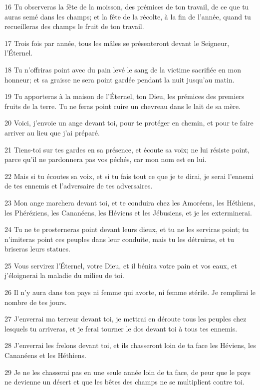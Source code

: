 \par 16 Tu observeras la fête de la moisson, des prémices de ton travail, de ce que tu auras semé dans les champs; et la fête de la récolte, à la fin de l'année, quand tu recueilleras des champs le fruit de ton travail.
\par 17 Trois fois par année, tous les mâles se présenteront devant le Seigneur, l'Éternel.
\par 18 Tu n'offriras point avec du pain levé le sang de la victime sacrifiée en mon honneur; et sa graisse ne sera point gardée pendant la nuit jusqu'au matin.
\par 19 Tu apporteras à la maison de l'Éternel, ton Dieu, les prémices des premiers fruits de la terre. Tu ne feras point cuire un chevreau dans le lait de sa mère.
\par 20 Voici, j'envoie un ange devant toi, pour te protéger en chemin, et pour te faire arriver au lieu que j'ai préparé.
\par 21 Tiens-toi sur tes gardes en sa présence, et écoute sa voix; ne lui résiste point, parce qu'il ne pardonnera pas vos péchés, car mon nom est en lui.
\par 22 Mais si tu écoutes sa voix, et si tu fais tout ce que je te dirai, je serai l'ennemi de tes ennemis et l'adversaire de tes adversaires.
\par 23 Mon ange marchera devant toi, et te conduira chez les Amoréens, les Héthiens, les Phéréziens, les Cananéens, les Héviens et les Jébusiens, et je les exterminerai.
\par 24 Tu ne te prosterneras point devant leurs dieux, et tu ne les serviras point; tu n'imiteras point ces peuples dans leur conduite, mais tu les détruiras, et tu briseras leurs statues.
\par 25 Vous servirez l'Éternel, votre Dieu, et il bénira votre pain et vos eaux, et j'éloignerai la maladie du milieu de toi.
\par 26 Il n'y aura dans ton pays ni femme qui avorte, ni femme stérile. Je remplirai le nombre de tes jours.
\par 27 J'enverrai ma terreur devant toi, je mettrai en déroute tous les peuples chez lesquels tu arriveras, et je ferai tourner le dos devant toi à tous tes ennemis.
\par 28 J'enverrai les frelons devant toi, et ils chasseront loin de ta face les Héviens, les Cananéens et les Héthiens.
\par 29 Je ne les chasserai pas en une seule année loin de ta face, de peur que le pays ne devienne un désert et que les bêtes des champs ne se multiplient contre toi.
